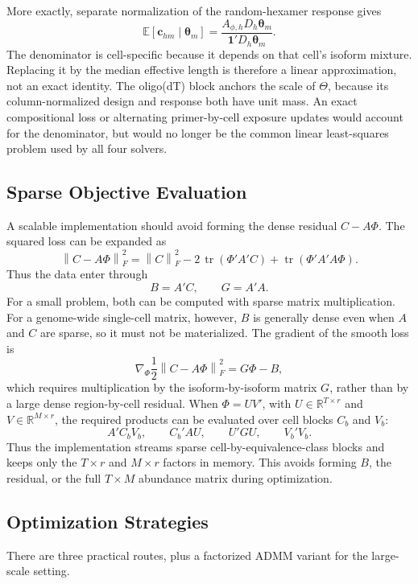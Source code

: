 \documentclass[11pt]{article}
\begin{document}
More exactly, separate normalization of the random-hexamer response gives
\[
  \mathbb E[\bm c_{hm}\mid\bm\theta_m]
  =
  \frac{A_{\phi,h}D_h\bm\theta_m}
       {\bm 1'D_h\bm\theta_m}.
\]
The denominator is cell-specific because it depends on that cell's isoform
mixture. Replacing it by the median effective length is therefore a linear
approximation, not an exact identity. The oligo(dT) block anchors the scale of
\(\Theta\), because its column-normalized design and response both have unit
mass. An exact compositional loss or alternating primer-by-cell exposure
updates would account for the denominator, but would no longer be the common
linear least-squares problem used by all four solvers.

\subsection*{Sparse Objective Evaluation}

A scalable implementation should avoid forming the dense residual
\(C-A\Phi\). The squared loss can be expanded as
\[
  \left\|C - A\Phi\right\|_F^2
  =
  \left\|C\right\|_F^2
  - 2\,\operatorname{tr}\!\left(\Phi' A' C\right)
  + \operatorname{tr}\!\left(\Phi' A' A \Phi\right).
\]
Thus the data enter through
\[
  B = A'C,
  \qquad
  G = A'A.
\]
For a small problem, both can be computed with sparse matrix multiplication.
For a genome-wide single-cell matrix, however, \(B\) is generally dense even
when \(A\) and \(C\) are sparse, so it must not be materialized. The gradient
of the smooth loss is
\[
  \nabla_{\Phi}
  \frac{1}{2}\left\|C-A\Phi\right\|_F^2
  =
  G\Phi - B,
\]
which requires multiplication by the isoform-by-isoform matrix \(G\), rather
than by a large dense region-by-cell residual. When
\(\Phi=UV'\), with \(U\in\mathbb{R}^{T\times r}\) and
\(V\in\mathbb{R}^{M\times r}\), the required products can be evaluated over
cell blocks \(C_b\) and \(V_b\):
\[
  A'C_bV_b,\qquad C_b' AU,\qquad U'GU,\qquad V_b'V_b.
\]
Thus the implementation streams sparse cell-by-equivalence-class blocks and
keeps only the \(T\times r\) and \(M\times r\) factors in memory. This avoids
forming \(B\), the residual, or the full \(T\times M\) abundance matrix during
optimization.

\subsection*{Optimization Strategies}

There are three practical routes, plus a factorized ADMM variant for the
large-scale setting.
\end{document}
